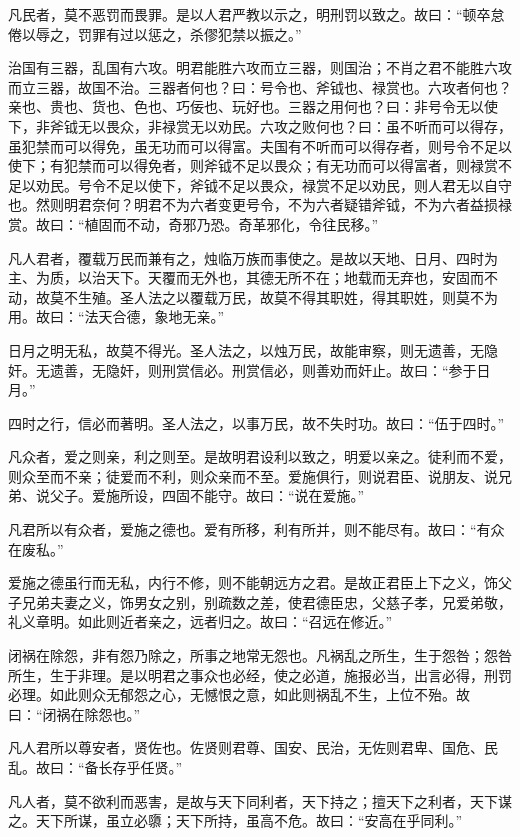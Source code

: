 \documentclass[]{article}
\begin{document}
凡民者，莫不恶罚而畏罪。是以人君严教以示之，明刑罚以致之。故曰：``顿卒怠倦以辱之，罚罪有过以惩之，杀僇犯禁以振之。''

治国有三器，乱国有六攻。明君能胜六攻而立三器，则国治；不肖之君不能胜六攻而立三器，故国不治。三器者何也？曰：号令也、斧钺也、禄赏也。六攻者何也？亲也、贵也、货也、色也、巧佞也、玩好也。三器之用何也？曰：非号令无以使下，非斧钺无以畏众，非禄赏无以劝民。六攻之败何也？曰：虽不听而可以得存，虽犯禁而可以得免，虽无功而可以得富。夫国有不听而可以得存者，则号令不足以使下；有犯禁而可以得免者，则斧钺不足以畏众；有无功而可以得富者，则禄赏不足以劝民。号令不足以使下，斧钺不足以畏众，禄赏不足以劝民，则人君无以自守也。然则明君奈何？明君不为六者变更号令，不为六者疑错斧钺，不为六者益损禄赏。故曰：``植固而不动，奇邪乃恐。奇革邪化，令往民移。''

凡人君者，覆载万民而兼有之，烛临万族而事使之。是故以天地、日月、四时为主、为质，以治天下。天覆而无外也，其德无所不在；地载而无弃也，安固而不动，故莫不生殖。圣人法之以覆载万民，故莫不得其职姓，得其职姓，则莫不为用。故曰：``法天合德，象地无亲。''

日月之明无私，故莫不得光。圣人法之，以烛万民，故能审察，则无遗善，无隐奸。无遗善，无隐奸，则刑赏信必。刑赏信必，则善劝而奸止。故曰：``参于日月。''

四时之行，信必而著明。圣人法之，以事万民，故不失时功。故曰：``伍于四时。''

凡众者，爱之则亲，利之则至。是故明君设利以致之，明爱以亲之。徒利而不爱，则众至而不亲；徒爱而不利，则众亲而不至。爱施俱行，则说君臣、说朋友、说兄弟、说父子。爱施所设，四固不能守。故曰：``说在爱施。''

凡君所以有众者，爱施之德也。爱有所移，利有所并，则不能尽有。故曰：``有众在废私。''

爱施之德虽行而无私，内行不修，则不能朝远方之君。是故正君臣上下之义，饰父子兄弟夫妻之义，饰男女之别，别疏数之差，使君德臣忠，父慈子孝，兄爱弟敬，礼义章明。如此则近者亲之，远者归之。故曰：``召远在修近。''

闭祸在除怨，非有怨乃除之，所事之地常无怨也。凡祸乱之所生，生于怨咎；怨咎所生，生于非理。是以明君之事众也必经，使之必道，施报必当，出言必得，刑罚必理。如此则众无郁怨之心，无憾恨之意，如此则祸乱不生，上位不殆。故曰：``闭祸在除怨也。''

凡人君所以尊安者，贤佐也。佐贤则君尊、国安、民治，无佐则君卑、国危、民乱。故曰：``备长存乎任贤。''

凡人者，莫不欲利而恶害，是故与天下同利者，天下持之；擅天下之利者，天下谋之。天下所谋，虽立必隳；天下所持，虽高不危。故曰：``安高在乎同利。''
\end{document}
